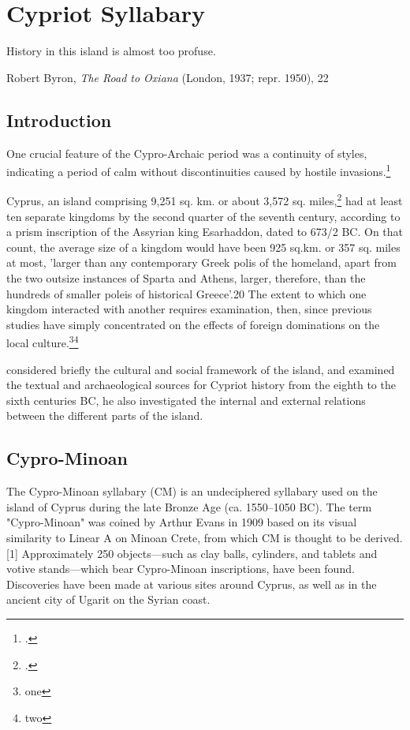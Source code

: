 \chapter{Cypriot Syllabary}
\label{s:cypriot}
\arial
\epigraph{History in this island is almost too profuse.}
{Robert Byron, \textit{The Road to Oxiana} (London, 1937; repr. 1950), 22}
\section{Introduction}

One crucial feature of the Cypro-Archaic period was a continuity of styles, indicating a period of calm without discontinuities caused by hostile invasions.\footcite[page 4, \ldots different foreign powers were perhaps less hostile than is
generally thought. The crucial feature of the Cypro-Archaic period was
not the series of disruptions apparently resulting from invasion, but the
continuity of styles evident in the archaeology.]{Reyes1994} 


Cyprus, an island comprising 9,251 sq. km. or about 3,572 sq. miles,\footcite{Reyes1994} had at least ten separate
kingdoms by the second quarter of the seventh century, according to a prism inscription of the Assyrian king Esarhaddon, dated to 673/2 BC. On that count, the average size of a kingdom would have been 925 sq.km. or 357 sq. miles at most, 'larger than any contemporary Greek polis of the homeland, apart from the two outsize instances of Sparta and
Athens, larger, therefore, than the hundreds of smaller poleis of historical Greece'.20 The extent to which one kingdom interacted with another requires examination, then, since previous studies have simply concentrated on the effects of foreign dominations on the local culture.\footnote{one}\footnote{two} 

\citeauthor{Reyes1994} considered briefly the cultural and social framework of the island, and examined the textual and archaeological sources for Cypriot history from the eighth to the sixth centuries BC, he also investigated the internal and external relations between the different parts of the island.

\section{Cypro-Minoan}

The Cypro-Minoan syllabary (CM) is an undeciphered syllabary used on the island of Cyprus during the late Bronze Age (ca. 1550–1050 BC). The term "Cypro-Minoan" was coined by Arthur Evans in 1909 based on its visual similarity to Linear A on Minoan Crete, from which CM is thought to be derived.[1] Approximately 250 objects—such as clay balls, cylinders, and tablets and votive stands—which bear Cypro-Minoan inscriptions, have been found. Discoveries have been made at various sites around Cyprus, as well as in the ancient city of Ugarit on the Syrian coast.

